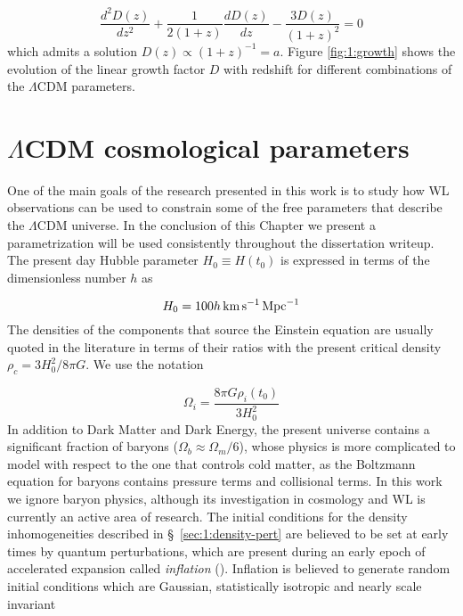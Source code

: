 \begin{equation}
\label{eq:1:growth-diff-cold}
\frac{d^2D(z)}{dz^2} + \frac{1}{2(1+z)}\frac{dD(z)}{dz}-\frac{3D(z)}{(1+z)^2} = 0
\end{equation}
% 
which admits a solution $D(z)\propto (1+z)^{-1}=a$. Figure \ref{fig:1:growth} shows the evolution of the linear growth factor $D$ with redshift for different combinations of the $\Lambda$CDM parameters. 


\section{$\Lambda$CDM cosmological parameters}
One of the main goals of the research presented in this work is to study how WL observations can be used to constrain some of the free parameters that describe the $\Lambda$CDM universe. In the conclusion of this Chapter we present a parametrization will be used consistently throughout the dissertation writeup. The present day Hubble parameter $H_0\equiv H(t_0)$ is expressed in terms of the dimensionless number $h$ as

\begin{equation}
\label{eq:1:hubble-present}
H_0 = 100h\,{\rm km}\,{\rm s}^{-1}\,{\rm Mpc}^{-1}
\end{equation} 
%
The densities of the components that source the Einstein equation are usually quoted in the literature in terms of their ratios with the present critical density $\rho_c=3H_0^2/8\pi G$. We use the notation

\begin{equation}
\label{eq:1:omega-def}
\Omega_i = \frac{8\pi G\rho_i(t_0)}{3H_0^2}
\end{equation}
%
In addition to Dark Matter and Dark Energy, the present universe contains a significant fraction of baryons ($\Omega_b\approx \Omega_m/6$), whose physics is more complicated to model with respect to the one that controls cold matter, as the Boltzmann equation for baryons contains pressure terms and collisional terms. In this work we ignore baryon physics, although its investigation in cosmology and WL is currently an active area of research. The initial conditions for the density inhomogeneities described in \S~\ref{sec:1:density-pert} are believed to be set at early times by quantum perturbations, which are present during an early epoch of accelerated expansion called \textit{inflation} (\citep{Inflation}). Inflation is believed to generate random initial conditions which are Gaussian, statistically isotropic and nearly scale invariant 

